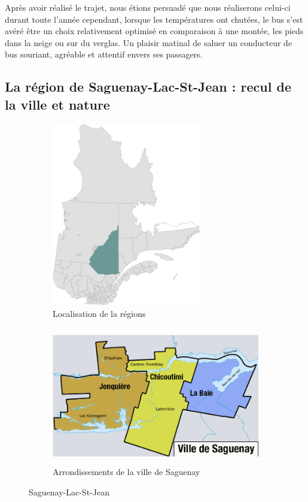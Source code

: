Après avoir réalisé le trajet, nous étions persuadé que nous réaliserons celui-ci durant toute l'année cependant, lorsque les températures ont chutées, le bus s'est avéré être un choix relativement optimisé en comparaison à une montée, les pieds dans la neige ou sur du verglas. Un plaisir matinal de saluer un conducteur de bus souriant, agréable et attentif envers ses passagers.


\subsection{La région de Saguenay-Lac-St-Jean : recul de la ville et nature}
\begin{figure}[ht]

\begin{subfigure}{0.5\textwidth}
\includegraphics[width=0.9\linewidth, height=8cm]
{images/environnement_etudes/Saguenay.png} 
\caption{Localisation de la régions}
\label{fig:subim1}
\end{subfigure}
\begin{subfigure}{0.5\textwidth}
\includegraphics[width=0.9\linewidth, height=6cm]
{images/environnement_etudes/Arrondissements_de_Saguenay.png}
\caption{Arrondissements de la ville de Saguenay}
\label{fig:subim2}
\end{subfigure}

\caption{Saguenay-Lac-St-Jean}
\label{fig:image2}
\end{figure}

